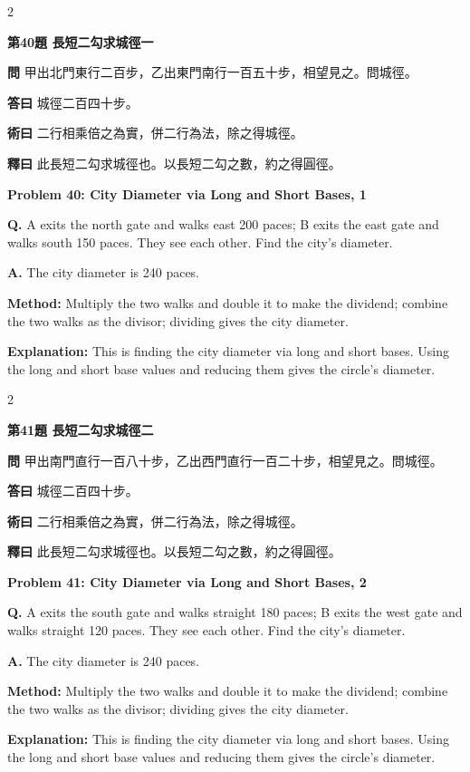 \documentclass[11pt,a4paper]{article}
\newcommand{\wen}[1]{\noindent\textbf{問} #1\par\smallskip}
\newcommand{\da}[1]{\noindent\textbf{答曰} #1\par\smallskip}
\newcommand{\shu}[1]{\noindent\textbf{術曰} #1\par\smallskip}
\newcommand{\shi}[1]{\noindent\textbf{釋曰} #1\par\smallskip}
\newcommand{\wenE}[1]{\noindent\textbf{Q.} #1\par\smallskip}
\newcommand{\daE}[1]{\noindent\textbf{A.} #1\par\smallskip}
\newcommand{\shuE}[1]{\noindent\textbf{Method:} #1\par\smallskip}
\newcommand{\shiE}[1]{\noindent\textbf{Explanation:} #1\par\smallskip}
\begin{document}
\begin{paracol}{2}

\noindent\textbf{第40題 長短二勾求城徑一}

\wen{甲出北門東行二百步，乙出東門南行一百五十步，相望見之。問城徑。}
\da{城徑二百四十步。}
\shu{二行相乘倍之為實，併二行為法，除之得城徑。}
\shi{此長短二勾求城徑也。以長短二勾之數，約之得圓徑。}

\switchcolumn

\noindent\textbf{Problem 40: City Diameter via Long and Short Bases, 1}

\wenE{A exits the north gate and walks east 200 paces; B exits the east gate and walks south 150 paces. They see each other. Find the city's diameter.}
\daE{The city diameter is 240 paces.}
\shuE{Multiply the two walks and double it to make the dividend; combine the two walks as the divisor; dividing gives the city diameter.}
\shiE{This is finding the city diameter via long and short bases. Using the long and short base values and reducing them gives the circle's diameter.}

\end{paracol}

\bigskip

\begin{paracol}{2}

\noindent\textbf{第41題 長短二勾求城徑二}

\wen{甲出南門直行一百八十步，乙出西門直行一百二十步，相望見之。問城徑。}
\da{城徑二百四十步。}
\shu{二行相乘倍之為實，併二行為法，除之得城徑。}
\shi{此長短二勾求城徑也。以長短二勾之數，約之得圓徑。}

\switchcolumn

\noindent\textbf{Problem 41: City Diameter via Long and Short Bases, 2}

\wenE{A exits the south gate and walks straight 180 paces; B exits the west gate and walks straight 120 paces. They see each other. Find the city's diameter.}
\daE{The city diameter is 240 paces.}
\shuE{Multiply the two walks and double it to make the dividend; combine the two walks as the divisor; dividing gives the city diameter.}
\shiE{This is finding the city diameter via long and short bases. Using the long and short base values and reducing them gives the circle's diameter.}

\end{paracol}

\clearpage

\end{document}
